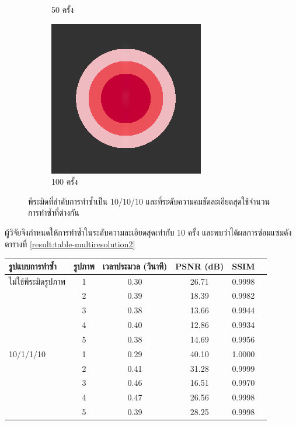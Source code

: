 \documentclass[hidelinks, a4paper,12pt]{article}
\numberwithin{equation}{section}							%
\numberwithin{equation}{section}
\begin{document}
{\begin{figure}[H]
\begin{subfigure}{0.4\linewidth}
			\caption{50 ครั้ง}
		\end{subfigure}
		\begin{subfigure}{0.4\linewidth}
			\centering
			\includegraphics[width=0.7\linewidth]{images/just10enough/only100time.png}			
			\caption{100 ครั้ง}
		\end{subfigure}
		\caption{พีระมิดที่ลำดับการทำซ้ำเป็น 10/10/10 และที่ระดับความคมชัดละเอียดสุดใช้จำนวนการทำซ้ำที่ต่างกัน}
	\end{figure}
	\clearpage
	 \hspace{1cm} ผู้วิจัยจึงกำหนดให้การทำซ้ำในระดับความละเอียดสุดเท่ากับ 10 ครั้ง และพบว่าได้ผลการซ่อมแซมดังตารางที่ \ref{result:table-multiresolution2}
		\begin{table}[H]
		\centering
		\small
		\begin{tabular}[ht]{|l|c|c|c|c|c|}
			\hline
			รูปแบบการทำซ้ำ  & รูปภาพ &เวลาประมวล  (วินาที) & PSNR (dB) & SSIM \\
			\hline
			ไม่ใช้พีระมิดรูปภาพ & 1 & 0.30  & 26.71  & 0.9998 \\ 
			& 2 & 0.39  & 18.39  & 0.9982 \\
			& 3 & 0.38 & 13.66  & 0.9944 \\
			& 4 & 0.40  & 12.86 & 0.9934 \\
			& 5 & 0.38 & 14.69 &  0.9956\\
			\hline
			10/1/1/10 & 1 & 0.29 & 40.10 & 1.0000\\
			& 2 & 0.41 & 31.28 & 0.9999 \\
			& 3 & 0.46 & 16.51 & 0.9970 \\
			& 4 & 0.47 & 26.56 & 0.9998\\
			& 5 & 0.39 & 28.25 & 0.9998 \\

\end{tabular}
\end{table}}
\end{document}
